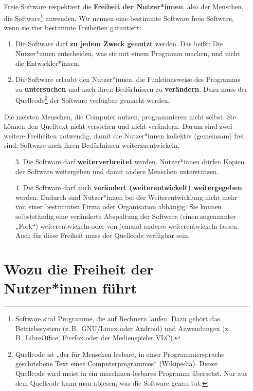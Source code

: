 \documentclass[a5paper,12pt]{scrartcl}
\begin{document}
Freie Software respektiert die \textbf{Freiheit der Nutzer*innen},
also der Menschen, die Software\footnote{Software sind Programme, die
  auf Rechnern laufen. Dazu gehört das Betriebssystem (z.\,B.\
  GNU/Linux oder Android) und Anwendungen (z.\,B.\ LibreOffice,
  Firefox oder der Medienspieler VLC).} anwenden. Wir nennen eine
bestimmte Software freie Software, wenn sie vier bestimmte Freiheiten
garantiert:
\begin{enumerate}
\item Die Software darf \textbf{zu jedem Zweck genutzt} werden. Das
  heißt: Die Nutzer*innen entscheiden, was sie mit einem Programm
  machen, und nicht die Entwickler*innen.
\item Die Software erlaubt den Nutzer*innen, die Funktionsweise des
  Programms zu \textbf{untersuchen} und nach ihren Bedürfnissen zu
  \textbf{verändern}. Dazu muss der Quellcode\footnote{Quellcode ist
    „der für Menschen lesbare, in einer Programmiersprache
    geschriebene Text eines Computerprogrammes“ (Wikipedia). Dieser
    Quellcode wird meist in ein maschinen-lesbares Programm
    übersetzt. Nur aus dem Quellcode kann man ablesen, was die
    Software genau tut.} der Software verfügbar gemacht werden.
\end{enumerate}

Die meisten Menschen, die Computer nutzen, programmieren nicht
selbst. Sie können den Quelltext nicht verstehen und nicht
verändern. Darum sind zwei weitere Freiheiten notwendig, damit die
Nutzer*innen kollektiv (gemeinsam) frei sind, Software nach ihren
Bedürfnissen weiterzuentwickeln.

\begin{enumerate}
\item[3.] Die Software darf \textbf{weiterverbreitet}
  werden. Nutzer*innen dürfen Kopien der Software weitergeben und
  damit andere Menschen unterstützen.
\item[4.] Die Software darf auch \textbf{verändert (weiterentwickelt)
    weitergegeben} werden. Dadurch sind Nutzer*innen bei der
  Weiterentwicklung nicht mehr von einer bestimmten Firma oder
  Organisation abhängig: Sie können selbstständig eine veränderte
  Abspaltung der Software (einen sogenannter „Fork“) weiterentwickeln
  oder von jemand anderes weiterentwickeln lassen. Auch für diese
  Freiheit muss der Quellcode verfügbar sein.
\end{enumerate}


\section{Wozu die Freiheit der Nutzer*innen führt}
\end{document}
